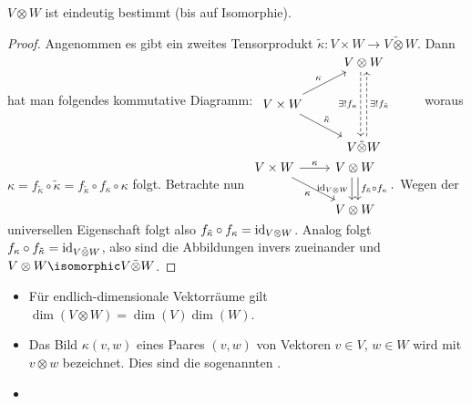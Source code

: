 \begin{lem} \label{5.11}
    $V \otimes W$ ist eindeutig bestimmt (bis auf Isomorphie).
    \begin{proof}
        Angenommen es gibt ein zweites Tensorprodukt $\tilde \kappa: V \times W \to V \tilde \otimes W$.
        Dann hat man folgendes kommutative Diagramm:
        \begin{math}
            \begin{tikzcd}
                & V \otimes W \ar[dd,"\exists! f_\kappa"',shift right,dashed] & \\
                V \times W \ar[ru,"\kappa"] \ar[rd,"\tilde \kappa"] & \\
                & V \tilde \otimes W \ar[uu,"\exists! f_{\tilde \kappa}"',shift right,dashed]
            \end{tikzcd}
        \end{math}
        woraus
        \begin{math}
            \kappa
            = f_{\tilde \kappa} \circ \tilde \kappa
            = f_{\tilde \kappa} \circ f_\kappa \circ \kappa
        \end{math}
        folgt.
        Betrachte nun
        \begin{math}
            \begin{tikzcd}
                V \times W \ar[r,"\kappa"] \ar[dr,"\kappa"'] & V \otimes W \ar[d,"\id_{V\otimes W}"',shift right] \ar[d,"f_{\tilde \kappa} \circ f_\kappa",shift left] \\
                & V \otimes W
            \end{tikzcd}.
        \end{math}
        Wegen der universellen Eigenschaft folgt also $f_{\tilde \kappa} \circ f_\kappa = \operatorname{id}_{V \otimes W}$.
        Analog folgt $f_\kappa \circ f_{\tilde \kappa} = \operatorname{id}_{V \tilde \otimes W}$, also sind die Abbildungen invers zueinander und $V \otimes W \isomorphic V \tilde \otimes W$.
    \end{proof}
    \begin{note}
        \begin{itemize}
            \item
                Für endlich-dimensionale Vektorräume gilt $\dim(V \otimes W) = \dim(V) \dim(W)$.
            \item
                Das Bild $\kappa(v,w)$ eines Paares $(v, w)$ von Vektoren $v \in V$, $w \in W$ wird mit $v \otimes w$ bezeichnet.
                Dies sind die sogenannten .
            \item

\end{itemize}
\end{note}
\end{lem}
